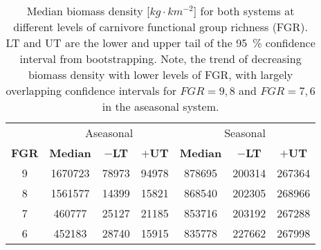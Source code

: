 \begin{table}[ht!]
\centering
\caption[Median biomass density at different levels of function group richness]{Median biomass density [$kg\cdot km^{-2}$] for both
               systems at different levels of carnivore functional group richness
               (FGR). LT and UT are the lower and upper tail of the 95~\%
               confidence interval from bootstrapping. Note, the trend of decreasing biomass density with lower levels of FGR, with largely overlapping confidence intervals for $FGR = 9, 8$ and $FGR = 7, 6$ in the aseasonal system.} 
\label{tab:chap:res:median}
\begin{tabular*}{\textwidth}{@{\extracolsep{\fill} }ccccccc}
  \toprule
  & \multicolumn{3}{c}{Aseasonal} & \multicolumn{3}{c}{Seasonal} \\ \cmidrule{2-4} \cmidrule{5-7}
\textbf{FGR} & \textbf{Median} & \textbf{$-$LT} & \textbf{$+$UT} & \textbf{Median} & \textbf{$-$LT} & \textbf{$+$UT} \\ 
  \midrule
  9 & 1670723 & 78973 & 94978 & 878695 & 200314 & 267364 \\ 
    8 & 1561577 & 14399 & 15821 & 868540 & 202305 & 268966 \\ 
    7 & 460777 & 25127 & 21185 & 853716 & 203192 & 267288 \\ 
    6 & 452183 & 28740 & 15915 & 835778 & 227662 & 267998 \\ 
   \bottomrule
\end{tabular*}
\end{table}
